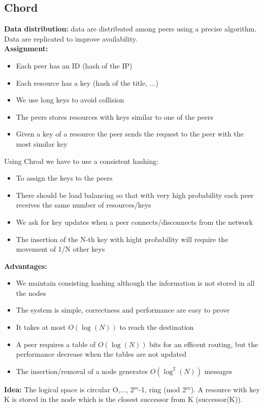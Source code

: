 \documentclass[paper=a4, fontsize=11pt]{scrartcl} %
\numberwithin{equation}{section} %
\numberwithin{figure}{section} %
\numberwithin{table}{section} %
\begin{document}
\subsection*{Chord}
\textbf{Data distribution:} data are distributed among peers using a precise algorithm. Data are replicated to improve availability.\\
\textbf{Assignment:}
\begin{itemize}
\item Each peer has an ID (hash of the IP)
\item Each resource has a key (hash of the title, ...)
\item We use long keys to avoid collision
\item The peers stores resources with keys similar to one of the peers
\item Given a key of a resource the peer sends the request to the peer with the most similar key
\end{itemize}
Using Chrod we have to use a consistent hashing:
\begin{itemize}
\item To assign the keys to the peers
\item There should be load balancing so that with very high probability each peer receives the same number of resources/keys
\item We ask for key updates when a peer connects/disconnects from the network
\item The insertion of the N-th key with hight probability will require the movement of 1/N other keys
\end{itemize}
\textbf{Advantages:}
\begin{itemize}
\item We maintain consisting hashing although the information is not stored in all the nodes
\item The system is simple, correctness and performance are easy to prove
\item It takes at most $O(\log(N))$ to reach the destination
\item A peer requires a table of $O(\log(N))$ bits for an efficent routing, but the performance decrease when the tables are not updated
\item The insertion/removal of a node generates $O(\log^2(N))$ messages
\end{itemize}
\textbf{Idea:} The logical space is circular O,..., 2$^m$-1, ring (mod 2$^m$). A resource with key K is stored in the node which is the closest successor from K (successor(K)).
\end{document}
